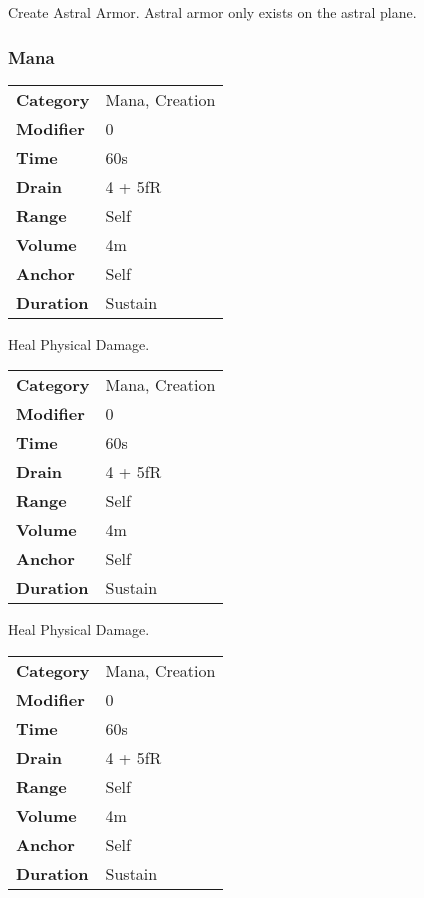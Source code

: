\hfil

Create Astral Armor. Astral armor only exists on the astral plane.

\subsubsection{Mana}


\begin{tabular}{ll}
    \textbf{Category} & Mana, Creation \\
    \textbf{Modifier} & 0              \\
    \textbf{Time}     & 60s            \\
    \textbf{Drain}    & 4 + 5fR        \\
    \textbf{Range}    & Self           \\
    \textbf{Volume}   & 4m             \\
    \textbf{Anchor}   & Self           \\
    \textbf{Duration} & Sustain        \\
\end{tabular}

\hfil

Heal Physical Damage.



\begin{tabular}{ll}
    \textbf{Category} & Mana, Creation \\
    \textbf{Modifier} & 0              \\
    \textbf{Time}     & 60s            \\
    \textbf{Drain}    & 4 + 5fR        \\
    \textbf{Range}    & Self           \\
    \textbf{Volume}   & 4m             \\
    \textbf{Anchor}   & Self           \\
    \textbf{Duration} & Sustain        \\
\end{tabular}

\hfil

Heal Physical Damage.



\begin{tabular}{ll}
    \textbf{Category} & Mana, Creation \\
    \textbf{Modifier} & 0              \\
    \textbf{Time}     & 60s            \\
    \textbf{Drain}    & 4 + 5fR        \\
    \textbf{Range}    & Self           \\
    \textbf{Volume}   & 4m             \\
    \textbf{Anchor}   & Self           \\
    \textbf{Duration} & Sustain        \\
\end{tabular}

